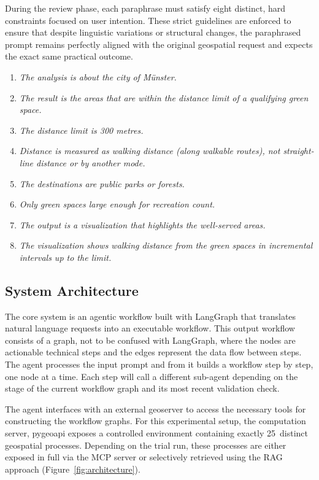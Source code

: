 During the review phase, each paraphrase must satisfy eight distinct, hard constraints focused on
user intention. These strict guidelines are enforced to ensure that despite linguistic variations
or structural changes, the paraphrased prompt remains perfectly aligned with the original
geospatial request and expects the exact same practical outcome.

\begin{enumerate}
  \item \emph{The analysis is about the city of Münster.}
  \item \emph{The result is the areas that are within the distance limit of a qualifying green
    space.}
  \item \emph{The distance limit is 300 metres.}
  \item \emph{Distance is measured as walking distance (along walkable routes), not straight-line
    distance or by another mode.}
  \item \emph{The destinations are public parks or forests.}
  \item \emph{Only green spaces large enough for recreation count.}
  \item \emph{The output is a visualization that highlights the well-served areas.}
  \item \emph{The visualization shows walking distance from the green spaces in incremental
    intervals up to the limit.}
\end{enumerate}

\subsection{System Architecture}
\label{sec:architecture}

The core system is an agentic workflow built with LangGraph that translates natural language
requests into an executable workflow. This output workflow consists of a graph, not to be
confused with LangGraph, where the nodes are actionable technical steps and the edges represent
the data flow between steps. The agent processes the input prompt and from it builds a workflow
step by step, one node at a time. Each step will call a different sub-agent depending on the
stage of the current workflow graph and its most recent validation check.

The agent interfaces with an external geoserver to access the necessary tools for constructing
the workflow graphs. For this experimental setup, the computation server, pygeoapi
\citep{kralidis2026} exposes a controlled environment containing exactly 25~distinct geospatial
processes. Depending on the trial run, these processes are either exposed in full via the MCP
server or selectively retrieved using the RAG approach (Figure~\ref{fig:architecture}).


